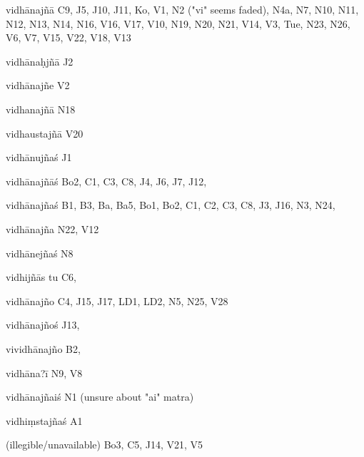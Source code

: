 \begin{ekdosis}
\begin{marma}[hp01_055]
\begin{marma}[hp02_009]
\begin{marma}[hp02_011]
\begin{marma}[hp02_40c]
\begin{description}
        \end{description}
\end{marma}

\begin{marma}[hp02_43a]
\item[vidhānajñā] C9, J5, J10, J11, Ko, V1, N2 ("vi" seems faded), N4a, N7, N10, N11, N12, N13, N14, N16, V16, V17, V10, N19, N20, N21, V14, V3, Tue, N23, N26, V6, V7, V15, V22, V18, V13
\item[vidhānaḥjñā] J2
\item[vidhānajñe] V2
\item[vidhanajñā] N18
\item[vidhaustajñā] V20
\item[vidhānujñaś] J1
\item[vidhānajñāś] Bo2, C1, C3, C8, J4, J6, J7, J12, 
\item[vidhānajñaś] B1, B3, Ba, Ba5, Bo1, Bo2, C1, C2, C3, C8, J3, J16, N3, N24,
\item[vidhānajña] N22, V12
\item[vidhānejñaś] N8
\item[vidhijñās tu] C6,
\item[vidhānajño] C4, J15, J17, LD1, LD2, N5, N25, V28
\item[vidhānajñoś] J13, 
\item[vividhānajño] B2, 
\item[vidhāna?ī] N9, V8
\item[vidhānajñaiś] N1 (unsure about "ai" matra)
\item[vidhiṃstajñaś] A1
\item[(illegible/unavailable)] Bo3, C5, J14, V21, V5
 \begin{description}

        \end{description}
\end{marma}


\end{marma}
\end{marma}
\end{marma}
\end{ekdosis}
